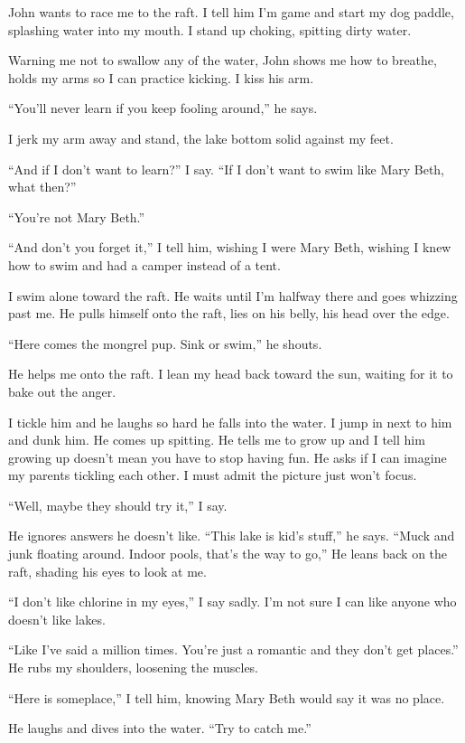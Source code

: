 \documentclass[
]{article}
\begin{document}
John wants to race me to the raft. I tell him I'm game and start my dog
paddle, splashing water into my mouth. I stand up choking, spitting
dirty water.

Warning me not to swallow any of the water, John shows me how to
breathe, holds my arms so I can practice kicking. I kiss his arm.

``You'll never learn if you keep fooling around,'' he says.

I jerk my arm away and stand, the lake bottom solid against my feet.

``And if I don't want to learn?'' I say. ``If I don't want to swim like
Mary Beth, what then?''

``You're not Mary Beth.''

``And don't you forget it,'' I tell him, wishing I were Mary Beth,
wishing I knew how to swim and had a camper instead of a tent.

I swim alone toward the raft. He waits until I'm halfway there and goes
whizzing past me. He pulls himself onto the raft, lies on his belly, his
head over the edge.

``Here comes the mongrel pup. Sink or swim,'' he shouts.

He helps me onto the raft. I lean my head back toward the sun, waiting
for it to bake out the anger.

I tickle him and he laughs so hard he falls into the water. I jump in
next to him and dunk him. He comes up spitting. He tells me to grow up
and I tell him growing up doesn't mean you have to stop having fun. He
asks if I can imagine my parents tickling each other. I must admit the
picture just won't focus.

``Well, maybe they should try it,'' I say.

He ignores answers he doesn't like. ``This lake is kid's stuff,'' he
says. ``Muck and junk floating around. Indoor pools, that's the way to
go,'' He leans back on the raft, shading his eyes to look at me.

``I don't like chlorine in my eyes,'' I say sadly. I'm not sure I can
like anyone who doesn't like lakes.

``Like I've said a million times. You're just a romantic and they don't
get places.'' He rubs my shoulders, loosening the muscles.

``Here is someplace,'' I tell him, knowing Mary Beth would say it was no
place.

He laughs and dives into the water. ``Try to catch me.''
\end{document}

